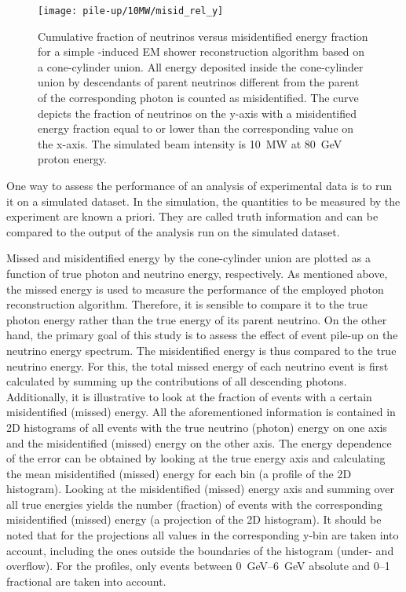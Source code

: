 \begin{figure}[htb]
	\centering
	\texttt{[image: pile-up/10MW/misid\_rel\_y]}
	\caption{Cumulative fraction of neutrinos versus misidentified energy fraction for a simple \Pgpz-induced EM shower reconstruction algorithm based on a cone-cylinder union.
		All energy deposited inside the cone-cylinder union by descendants of parent neutrinos different from the parent of the corresponding \Pgpz photon is counted as misidentified.
		The curve depicts the fraction of neutrinos on the y-axis with a misidentified energy fraction equal to or lower than the corresponding value on the x-axis.
		The simulated beam intensity is \SI{10}{\mega\watt} at \SI{80}{\giga\electronvolt} proton energy.}
	\label{fig:dune-nd_10MW_misid-rel-y}
\end{figure}

One way to assess the performance of an analysis of experimental data is to run it on a simulated dataset.
In the simulation, the quantities to be measured by the experiment are known a priori.
They are called truth information and can be compared to the output of the analysis run on the simulated dataset.

Missed and misidentified energy by the cone-cylinder union are plotted as a function of true photon and neutrino energy, respectively.
As mentioned above, the missed energy is used to measure the performance of the employed photon reconstruction algorithm.
Therefore, it is sensible to compare it to the true photon energy rather than the true energy of its parent neutrino.
On the other hand, the primary goal of this study is to assess the effect of event pile-up on the neutrino energy spectrum.
The misidentified energy is thus compared to the true neutrino energy.
For this, the total missed energy of each neutrino event is first calculated by summing up the contributions of all descending \Pgpz photons.
Additionally, it is illustrative to look at the fraction of events with a certain misidentified (missed) energy.
All the aforementioned information is contained in 2D histograms of all events with the true neutrino (photon) energy on one axis and the misidentified (missed) energy on the other axis.
The energy dependence of the error can be obtained by looking at the true energy axis and calculating the mean misidentified (missed) energy for each bin (a profile of the 2D histogram).
Looking at the misidentified (missed) energy axis and summing over all true energies yields the number (fraction) of events with the corresponding misidentified (missed) energy (a projection of the 2D histogram).
It should be noted that for the projections all values in the corresponding y-bin are taken into account, including the ones outside the boundaries of the histogram (under- and overflow).
For the profiles, only events between \SIrange{0}{6}{\giga\electronvolt} absolute and \numrange{0}{1} fractional are taken into account.

